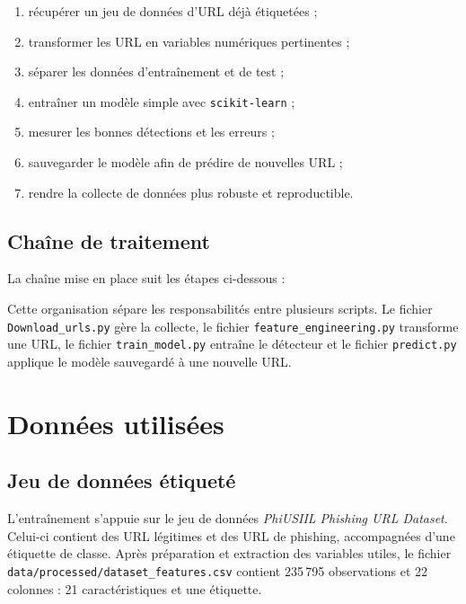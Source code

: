 \documentclass[11pt,a4paper]{report}
\begin{document}
\begin{enumerate}
  \item récupérer un jeu de données d'URL déjà étiquetées ;
  \item transformer les URL en variables numériques pertinentes ;
  \item séparer les données d'entraînement et de test ;
  \item entraîner un modèle simple avec \texttt{scikit-learn} ;
  \item mesurer les bonnes détections et les erreurs ;
  \item sauvegarder le modèle afin de prédire de nouvelles URL ;
  \item rendre la collecte de données plus robuste et reproductible.
\end{enumerate}

\section{Chaîne de traitement}

La chaîne mise en place suit les étapes ci-dessous :

\begin{center}
\end{center}

Cette organisation sépare les responsabilités entre plusieurs scripts. Le
fichier \texttt{Download\_urls.py} gère la collecte, le fichier
\texttt{feature\_engineering.py} transforme une URL, le fichier
\texttt{train\_model.py} entraîne le détecteur et le fichier
\texttt{predict.py} applique le modèle sauvegardé à une nouvelle URL.

\chapter{Données utilisées}

\section{Jeu de données étiqueté}

L'entraînement s'appuie sur le jeu de données \emph{PhiUSIIL Phishing URL
Dataset}. Celui-ci contient des URL légitimes et des URL de phishing,
accompagnées d'une étiquette de classe. Après préparation et extraction des
variables utiles, le fichier \texttt{data/processed/dataset\_features.csv} contient
235\,795 observations et 22 colonnes : 21 caractéristiques et une étiquette.
\end{document}
